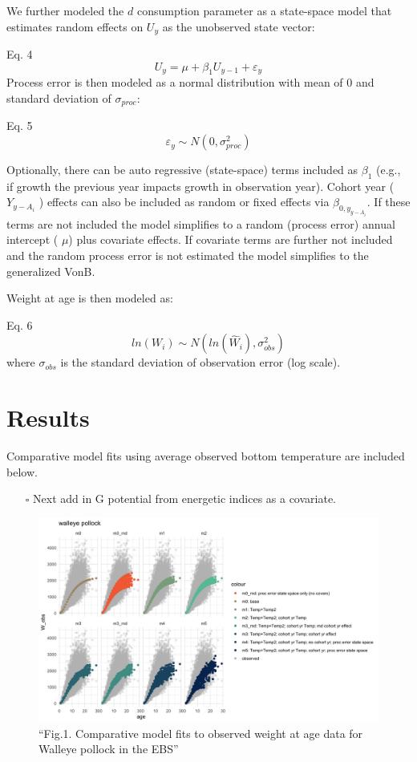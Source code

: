 \documentclass[
]{article}
\providecommand{\tightlist}{%
  \setlength{\itemsep}{0pt}\setlength{\parskip}{0pt}}
\begin{document}
We further modeled the \(d\) consumption parameter as a state-space
model that estimates random effects on \(U_{y}\) as the unobserved state
vector:

Eq. 4 \[ U_{y} = \mu+ \beta_{1}U_{y-1}+\varepsilon_y \] Process error is
then modeled as a normal distribution with mean of 0 and standard
deviation of \(\sigma_{proc}\):

Eq. 5 \[ \varepsilon_{y} \sim N(0,\sigma^2_{proc})\]

Optionally, there can be auto regressive (state-space) terms included as
\(\beta_1\) (e.g., if growth the previous year impacts growth in
observation year). Cohort year (\(Y_{y-A_i}\) ) effects can also be
included as random or fixed effects via \(\beta_{0,y_{y-A_i}}\). If
these terms are not included the model simplifies to a random (process
error) annual intercept ( \(\mu\)) plus covariate effects. If covariate
terms are further not included and the random process error is not
estimated the model simplifies to the generalized VonB.

Weight at age is then modeled as:

Eq. 6 \[ ln({W}_i) \sim N(ln(\hat{W}_i),\sigma^2_{obs})\] where
\(\sigma_{obs}\) is the standard deviation of observation error (log
scale).

\section{Results}\label{results}

Comparative model fits using average observed bottom temperature are
included below.

\begin{itemize}
\tightlist
\item[$\square$]
  Next add in G potential from energetic indices as a covariate.
\end{itemize}

\begin{figure}
\centering
\includegraphics{Figs/model_plots.jpg}
\caption{``Fig.1. Comparative model fits to observed weight at age data
for Walleye pollock in the EBS''}
\end{figure}
\end{document}
